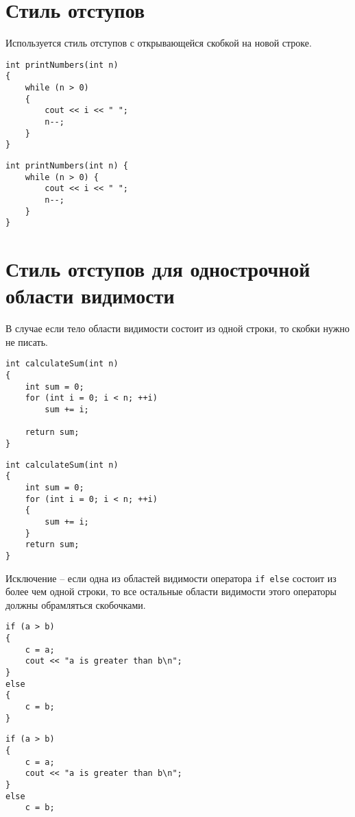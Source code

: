 \documentclass{article}
\begin{document}
\section{Стиль отступов}
Используется стиль отступов с открывающейся скобкой на новой строке.

\begin{multicols}{2}
\begin{lstlisting}[backgroundcolor = \color{correctcolor}]
int printNumbers(int n)
{
    while (n > 0)
    {
        cout << i << " ";
        n--;
    }
}
\end{lstlisting}

\begin{lstlisting}[backgroundcolor = \color{wrongcolor}]
int printNumbers(int n) {
    while (n > 0) {
        cout << i << " ";
        n--;
    }
}
\end{lstlisting}
\end{multicols}



\section{Стиль отступов для однострочной области видимости}
В случае если тело области видимости состоит из одной строки, то скобки нужно не писать.
\begin{multicols}{2}
\begin{lstlisting}[backgroundcolor = \color{correctcolor}]
int calculateSum(int n)
{
    int sum = 0;
    for (int i = 0; i < n; ++i)
        sum += i;
        
    return sum;
}
\end{lstlisting}
\vfill
\begin{lstlisting}[backgroundcolor = \color{wrongcolor}]
int calculateSum(int n)
{
    int sum = 0;
    for (int i = 0; i < n; ++i)
    {
        sum += i;
    }
    return sum;
}
\end{lstlisting}
\end{multicols}

Исключение -- если одна из областей видимости оператора \texttt{if else} состоит из более чем одной строки, то все остальные области видимости этого операторы должны обрамляться скобочками.
\begin{multicols}{2}
\noindent
\begin{lstlisting}[backgroundcolor = \color{correctcolor}]
if (a > b)
{
    c = a;
    cout << "a is greater than b\n";
}
else
{
    c = b;
}
\end{lstlisting}
\vfill
\begin{lstlisting}[backgroundcolor = \color{wrongcolor}]
if (a > b)
{
    c = a;
    cout << "a is greater than b\n";
}
else
    c = b;
\end{lstlisting}
\end{multicols}
\end{document}
